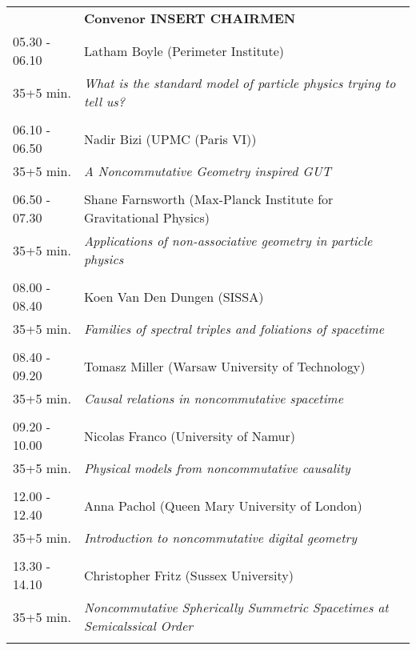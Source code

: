 \begin{longtable}{p{3cm}p{13cm}}
&\hfill {\bf Convenor INSERT CHAIRMEN }\\ 
05.30 - 06.10 & Latham Boyle (Perimeter Institute)\\ 
35+5 min. & {\it What is the standard model of particle physics trying to tell us?}\\ 
 & \\ 
06.10 - 06.50 & Nadir Bizi (UPMC (Paris VI))\\ 
35+5 min. & {\it A Noncommutative Geometry inspired GUT}\\ 
 & \\ 
06.50 - 07.30 & Shane Farnsworth (Max-Planck Institute for Gravitational Physics)\\ 
35+5 min. & {\it Applications of non-associative geometry in particle physics}\\ 
 & \\ 
08.00 - 08.40 & Koen Van Den Dungen (SISSA)\\ 
35+5 min. & {\it Families of spectral triples and foliations of spacetime}\\ 
 & \\ 
08.40 - 09.20 & Tomasz Miller (Warsaw University of Technology)\\ 
35+5 min. & {\it Causal relations in noncommutative spacetime}\\ 
 & \\ 
09.20 - 10.00 & Nicolas Franco (University of Namur)\\ 
35+5 min. & {\it Physical models from noncommutative causality}\\ 
 & \\ 
12.00 - 12.40 & Anna Pachol (Queen Mary University of London)\\ 
35+5 min. & {\it Introduction to noncommutative digital geometry}\\ 
 & \\ 
13.30 - 14.10 & Christopher Fritz (Sussex University)\\ 
35+5 min. & {\it Noncommutative Spherically Summetric Spacetimes at Semicalssical Order}\\ 
 & \\ 
\end{longtable}

